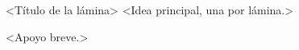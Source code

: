 

\renewcommand{\bmrtema}{<Asignatura> · <Grado> · <Tema>}
\renewcommand{\bmrprofe}{Prof. <Nombre>}




\begin{frame}{<Título de la lámina>}
\large
<Idea principal, una por lámina.>\par
\vspace{0.6em}
\normalsize
<Apoyo breve.>\par
\vspace{0.5em}
\centering{}
\end{frame}



